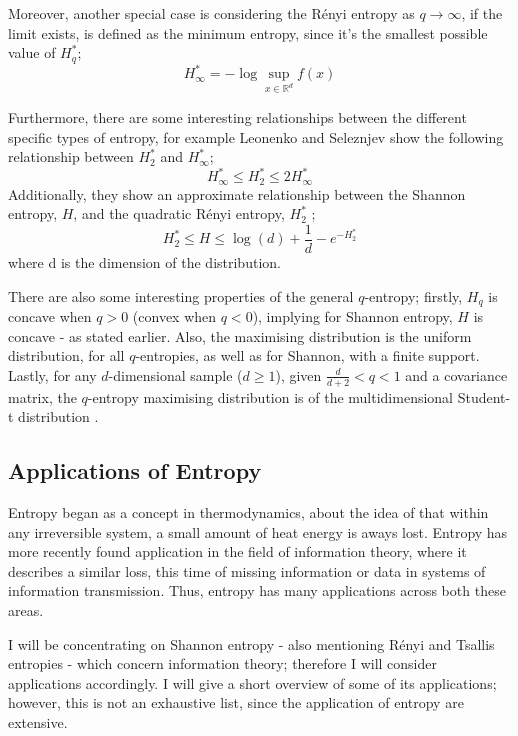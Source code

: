 \documentclass{report}
\begin{document}
Moreover, another special case is considering the R\'enyi entropy as $q \to \infty$, if the limit exists, is defined as the minimum entropy, since it's the smallest possible value of $H_{q}^{*}$;
\begin{equation}
H_{\infty}^{*} = - \log \sup_{x \in \mathbb{R}^d} f (x) \nonumber
\end{equation}

Furthermore, there are some interesting relationships between the different specific types of entropy, for example Leonenko and Seleznjev \cite{paper5} show the following relationship between $H_{2}^{*}$ and $H_{\infty}^{*}$;
\begin{equation}
H_{\infty}^{*} \leq H_{2}^{*} \leq 2H_{\infty}^{*}
\end{equation}
Additionally, they show an approximate relationship between the Shannon entropy, $H$, and the quadratic R\'enyi entropy, $ H_{2}^{*}$ ;
\begin{equation}
H_{2}^{*} \leq H \leq \log(d) + \frac{1}{d} - e^{-H_{2}^{*}} \nonumber
\end{equation}
where d is the dimension of the distribution.

There are also some interesting properties of the general $q$-entropy; firstly, $H_{q}$ is concave when $q > 0$ (convex when $q<0$), implying for Shannon entropy, $H$ is concave - as stated earlier. Also, the maximising distribution is the uniform distribution, for all  $q$-entropies, as well as for Shannon, with a finite support. Lastly, for any $d$-dimensional sample ($d \geq 1$), given $\frac{d}{d+2} < q < 1$ and a covariance matrix, the $q$-entropy maximising distribution is of the multidimensional Student-t distribution \cite{paper2}.




\subsection{Applications of Entropy}

Entropy began as a concept in thermodynamics, about the idea of that within any irreversible system, a small amount of heat energy is aways lost. Entropy has more recently found application in the field of information theory, where it describes a similar loss, this time of missing information or data in systems of information transmission. Thus, entropy has many applications across both these areas.

I will be concentrating on Shannon entropy - also mentioning R\'enyi and Tsallis entropies - which concern information theory; therefore I will consider applications accordingly. I will give a short overview of some of its applications; however, this is not an exhaustive list, since the application of entropy are extensive.
\end{document}
